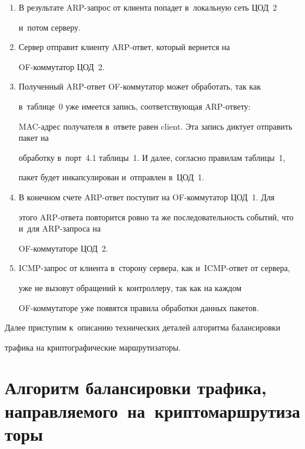 \begin{enumerate}
правило должно выставляться с~таймером неактивности для отслеживания 


изменения топологии сети.


\item В результате ARP-за\-прос от клиента попадет в~локальную сеть ЦОД~2 


и~потом серверу.


\item Сервер отправит клиенту ARP-ответ, который вернется на  


OF-ком\-му\-та\-тор ЦОД~2.


\item Полученный ARP-ответ OF-коммутатор может обработать, так как 


в~таб\-ли\-це~0 уже имеется запись, соответствующая ARP-от\-ве\-ту: 


MAC-ад\-рес получателя в~ответе равен client. Эта запись диктует отправить пакет на 


обработку в~порт~4.1 таблицы~1. И далее, согласно правилам таблицы~1, 


пакет будет инкапсулирован и~отправлен в~ЦОД~1.


\item В конечном счете ARP-от\-вет поступит на OF-коммутатор ЦОД~1. Для 


этого ARP-от\-ве\-та повторится ровно та же последовательность событий, что и~для ARP-за\-про\-са на 


OF-ком\-му\-та\-то\-ре ЦОД~2.


\item ICMP-запрос от клиента в~сторону сервера, как и~ICMP-от\-вет от сервера, 


уже не вызовут обращений к~контроллеру, так как на каждом  


OF-ком\-му\-та\-то\-ре уже появятся правила обработки данных пакетов.


\end{enumerate}


  


  Далее приступим к~описанию технических деталей алгоритма балансировки 


трафика на криптографические маршрутизаторы.





\section{Алгоритм балансировки трафика, направляемого~на~криптомаршрутизаторы}





